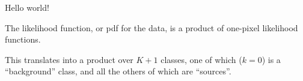 \documentclass[12pt]{article}
\begin{document}
Hello world!

The likelihood function, or pdf for the data, is a product of one-pixel likelihood functions.

This translates into a product over $K+1$ classes,
one of which ($k=0$) is a ``background'' class,
and all the others of which are ``sources''.
\end{document}
